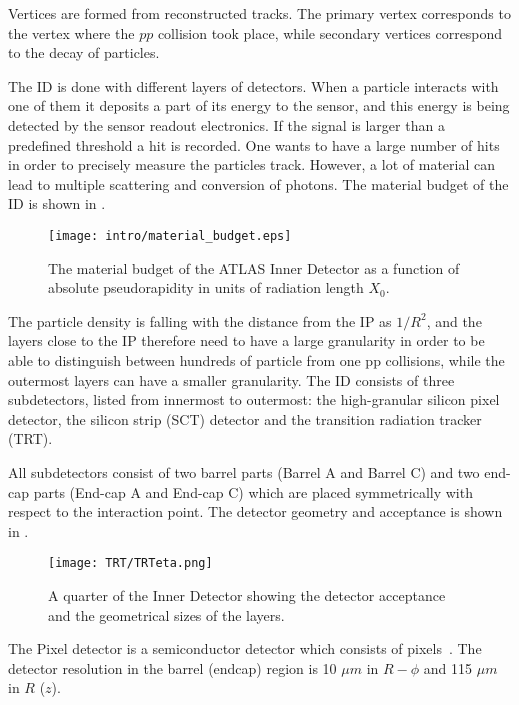 Vertices are formed from reconstructed tracks. The primary vertex corresponds to the vertex where the $pp$ collision took place, 
while secondary vertices correspond to the decay of particles.

The ID is done with different layers of detectors. When a particle interacts with one of them it deposits a part of its energy to the sensor,
and this energy is being detected by the sensor readout electronics. 
If the signal is larger than a predefined threshold a hit is recorded.
One wants to have a large number of hits in order to precisely measure the particles track.  
However, a lot of material can lead to multiple scattering and conversion of photons.
The material  budget of the ID is shown in .

\begin{figure}
\centering
\texttt{[image: intro/material\_budget.eps]}
\caption{ 
The material budget of the ATLAS Inner Detector as a function of absolute pseudorapidity in units of radiation length $X_0$.
}
\label{fig:material_budget}
\end{figure}


The particle density is falling with the distance from the IP as $1/R^2$, 
and the layers close to the IP therefore need to have a large granularity in order to be able to distinguish between
hundreds of particle from one pp collisions, while the outermost layers can have a smaller granularity.
The ID consists of three subdetectors, listed from innermost to outermost: the high-granular silicon pixel detector, the silicon strip (SCT) detector and the transition radiation tracker (TRT).

All subdetectors consist of two barrel parts (Barrel A and Barrel C) and two end-cap parts (End-cap A and End-cap C) 
which are placed symmetrically with respect to the interaction point.
The detector geometry and acceptance is shown in .

\begin{figure}
\centering
\texttt{[image: TRT/TRTeta.png]}
\caption{ 
A quarter of the Inner Detector showing the detector acceptance and the geometrical sizes of the layers.
}
\label{fig:ID_eta}
\end{figure}


The Pixel detector is a semiconductor detector which consists of pixels~\cite{Wermes:381263}.
The detector resolution in the barrel (endcap) region is 10 $\mu m$ in $R-\phi$ and 115 $\mu m$ in $R$ ($z$).

